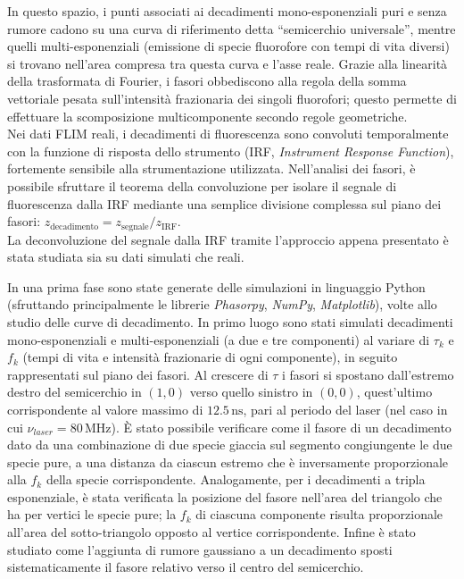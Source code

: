 \documentclass[a4paper, 11pt]{article}
\begin{document}
\noindent In questo spazio, i punti associati ai decadimenti mono-esponenziali puri e senza rumore cadono su una curva di riferimento detta ``semicerchio universale'', mentre quelli multi-esponenziali (emissione di specie fluorofore con tempi di vita diversi) si trovano nell'area compresa tra questa curva e l'asse reale. Grazie alla linearità della trasformata di Fourier, i fasori obbediscono alla regola della somma vettoriale pesata sull'intensità frazionaria dei singoli fluorofori; questo permette di effettuare la scomposizione multicomponente secondo regole geometriche.\\
Nei dati FLIM reali, i decadimenti di fluorescenza sono convoluti temporalmente con la funzione di risposta dello strumento (IRF, \textit{Instrument Response Function}), fortemente sensibile alla strumentazione utilizzata. Nell'analisi dei fasori, è possibile sfruttare il teorema della convoluzione per isolare il segnale di fluorescenza dalla IRF mediante una semplice divisione complessa sul piano dei fasori: $z_{\text{decadimento}} = z_{\text{segnale}}/z_{\text{IRF}}$.\\
La deconvoluzione del segnale dalla IRF tramite l'approccio appena presentato è stata studiata sia su dati simulati che reali.

In una prima fase sono state generate delle simulazioni in linguaggio Python (sfruttando principalmente le librerie \textit{Phasorpy}, \textit{NumPy}, \textit{Matplotlib}), volte allo studio delle curve di decadimento.
In primo luogo sono stati simulati decadimenti mono-esponenziali e multi-esponenziali (a due e tre componenti) al variare di $\tau_k$ e $f_k$ (tempi di vita e intensità frazionarie di ogni componente), in seguito rappresentati sul piano dei fasori. Al crescere di $\tau$ i fasori si spostano dall'estremo destro del semicerchio in $(1, 0)$ verso quello sinistro in $(0, 0)$, quest'ultimo corrispondente al valore massimo di $12.5\, \text{ns}$, pari al periodo del laser (nel caso in cui $\nu_{laser}=80\,\text{MHz}$). È stato possibile verificare come il fasore di un decadimento dato da una combinazione di due specie giaccia sul segmento congiungente le due specie pure, a una distanza da ciascun estremo che è inversamente proporzionale alla $f_k$ della specie corrispondente.
Analogamente, per i decadimenti a tripla esponenziale, è stata verificata la posizione del fasore nell'area del triangolo che ha per vertici le specie pure; la $f_k$ di ciascuna componente risulta proporzionale all'area del sotto-triangolo opposto al vertice corrispondente. Infine è stato studiato come l'aggiunta di rumore gaussiano a un decadimento sposti sistematicamente il fasore relativo verso il centro del semicerchio.
\end{document}
